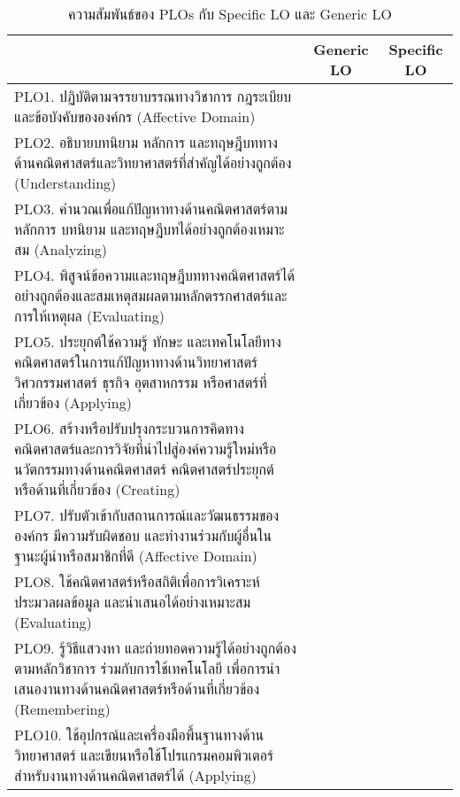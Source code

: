 \begin{center}
	\begin{longtable}{| >{\raggedright}p{} | p{} | p{} |}
		\caption{ความสัมพันธ์ของ PLOs กับ Specific LO และ Generic LO} 
		\label{table: req 1.1}
		\\
		\hline
		\multicolumn{1}{|c|}{\textbf{ผลลัพธ์การเรียนรู้ที่คาดหวัง (PLOs)}} & \multicolumn{1}{c|}{\textbf{Generic LO}} &\multicolumn{1}{c|}{ \textbf{Specific LO}} \\
		\hline
		\endhead
		PLO1. ปฏิบัติตามจรรยาบรรณทางวิชาการ กฎระเบียบ และข้อบังคับขององค์กร (Affective Domain) &\multicolumn{1}{c|}{\checkmark}&\\
		\hline
		PLO2. อธิบายบทนิยาม หลักการ และทฤษฎีบททางด้านคณิตศาสตร์และวิทยาศาสตร์ที่สำคัญได้อย่างถูกต้อง (Understanding) &&\multicolumn{1}{c|}{\checkmark}\\
		\hline
		PLO3. คำนวณเพื่อแก้ปัญหาทางด้านคณิตศาสตร์ตามหลักการ บทนิยาม และทฤษฎีบทได้อย่างถูกต้องเหมาะสม (Analyzing)&&\multicolumn{1}{c|}{\checkmark}\\
		\hline
		PLO4. พิสูจน์ข้อความและทฤษฎีบททางคณิตศาสตร์ได้อย่างถูกต้องและสมเหตุสมผลตามหลักตรรกศาสตร์และการให้เหตุผล (Evaluating)&&\multicolumn{1}{c|}{\checkmark}\\
		\hline
		PLO5. ประยุกต์ใช้ความรู้ ทักษะ และเทคโนโลยีทางคณิตศาสตร์ในการแก้ปัญหาทางด้านวิทยาศาสตร์ วิศวกรรมศาสตร์ ธุรกิจ อุตสาหกรรม หรือศาสตร์ที่เกี่ยวข้อง (Applying)&&\multicolumn{1}{c|}{\checkmark}\\
		\hline
		PLO6. สร้างหรือปรับปรุงกระบวนการคิดทางคณิตศาสตร์และการวิจัยที่นำไปสู่องค์ความรู้ใหม่หรือนวัตกรรมทางด้านคณิตศาสตร์ คณิตศาสตร์ประยุกต์ หรือด้านที่เกี่ยวข้อง (Creating)&&\multicolumn{1}{c|}{\checkmark}\\
		\hline
		PLO7. ปรับตัวเข้ากับสถานการณ์และวัฒนธรรมขององค์กร มีความรับผิดชอบ และทำงานร่วมกับผู้อื่นในฐานะผู้นำหรือสมาชิกที่ดี (Affective Domain)&\multicolumn{1}{c|}{\checkmark}&\\
		\hline
		PLO8. ใช้คณิตศาสตร์หรือสถิติเพื่อการวิเคราะห์ ประมวลผลข้อมูล และนำเสนอได้อย่างเหมาะสม (Evaluating)&&\multicolumn{1}{c|}{\checkmark}\\
		\hline
		PLO9. รู้วิธีแสวงหา และถ่ายทอดความรู้ได้อย่างถูกต้องตามหลักวิชาการ ร่วมกับการใช้เทคโนโลยี เพื่อการนำเสนองานทางด้านคณิตศาสตร์หรือด้านที่เกี่ยวข้อง (Remembering)&\multicolumn{1}{c|}{\checkmark}&\\
		\hline
		PLO10. ใช้อุปกรณ์และเครื่องมือพื้นฐานทางด้านวิทยาศาสตร์ และเขียนหรือใช้โปรแกรมคอมพิวเตอร์สำหรับงานทางด้านคณิตศาสตร์ได้ (Applying) &&\multicolumn{1}{c|}{\checkmark}\\
		\hline
	\end{longtable}
\end{center}
\begin{doclist}
\end{doclist}



